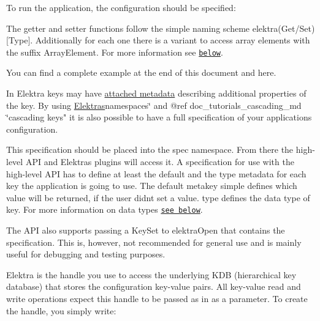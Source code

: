 To run the application, the configuration should be specified\+:




The getter and setter functions follow the simple naming scheme {\ttfamily elektra}({\ttfamily Get}/{\ttfamily Set})\mbox{[}Type\mbox{]}. Additionally for each one there is a variant to access array elements with the suffix {\ttfamily Array\+Element}. For more information see \href{#reading-and-writing-values}{\tt below}.

You can find a complete example at the end of this document and here.

In Elektra keys may have \hyperlink{doc_help_elektra-metadata_md}{attached metadata} describing additional properties of the key. By using \hyperlink{doc_tutorials_namespaces_md}{Elektra\textquotesingle{}s}namespaces\char`\"{} and @ref doc\+\_\+tutorials\+\_\+cascading\+\_\+md \char`\"{}cascading keys" it is also possible to have a full specification of your applications configuration.

This specification should be placed into the {\ttfamily spec} namespace. From there the high-\/level A\+PI and Elektra\textquotesingle{}s plugins will access it. A specification for use with the high-\/level A\+PI has to define at least the {\ttfamily default} and the {\ttfamily type} metadata for each key the application is going to use. The {\ttfamily default} metakey simple defines which value will be returned, if the user didn\textquotesingle{}t set a value. {\ttfamily type} defines the data type of key. For more information on data types \href{#data-types}{\tt see below}.

The A\+PI also supports passing a {\ttfamily Key\+Set} to {\ttfamily elektra\+Open} that contains the specification. This is, however, not recommended for general use and is mainly useful for debugging and testing purposes.

{\ttfamily Elektra} is the handle you use to access the underlying K\+DB (hierarchical key database) that stores the configuration key-\/value pairs. All key-\/value read and write operations expect this handle to be passed as in as a parameter. To create the handle, you simply write\+:




